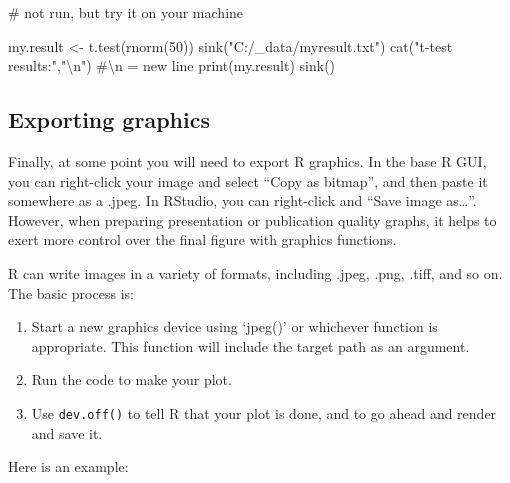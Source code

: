 \documentclass[
  13,
  letterpaper,
]{report}
\newenvironment{Shaded}{\begin{snugshade}}{\end{snugshade}}
\newcommand{\CommentTok}[1]{\textcolor[rgb]{0.37,0.37,0.37}{#1}}
\newcommand{\DecValTok}[1]{\textcolor[rgb]{0.68,0.00,0.00}{#1}}
\newcommand{\FunctionTok}[1]{\textcolor[rgb]{0.28,0.35,0.67}{#1}}
\newcommand{\NormalTok}[1]{\textcolor[rgb]{0.00,0.23,0.31}{#1}}
\newcommand{\OtherTok}[1]{\textcolor[rgb]{0.00,0.23,0.31}{#1}}
\newcommand{\SpecialCharTok}[1]{\textcolor[rgb]{0.37,0.37,0.37}{#1}}
\newcommand{\StringTok}[1]{\textcolor[rgb]{0.13,0.47,0.30}{#1}}
\begin{document}
\begin{Shaded}
\begin{Highlighting}[]
\CommentTok{\# not run, but try it on your machine}

\NormalTok{my.result }\OtherTok{\textless{}{-}} \FunctionTok{t.test}\NormalTok{(}\FunctionTok{rnorm}\NormalTok{(}\DecValTok{50}\NormalTok{))}
\FunctionTok{sink}\NormalTok{(}\StringTok{"C:/\_data/myresult.txt"}\NormalTok{)}
\FunctionTok{cat}\NormalTok{(}\StringTok{"t{-}test results:"}\NormalTok{,}\StringTok{"}\SpecialCharTok{\textbackslash{}n}\StringTok{"}\NormalTok{) }\CommentTok{\#\textbackslash{}n = new line}
\FunctionTok{print}\NormalTok{(my.result)}
\FunctionTok{sink}\NormalTok{()}
\end{Highlighting}
\end{Shaded}

\subsection{Exporting graphics}\label{sec-04-export-graphics}

Finally, at some point you will need to export R graphics. In the base R
GUI, you can right-click your image and select ``Copy as bitmap'', and
then paste it somewhere as a .jpeg. In RStudio, you can right-click and
``Save image as\ldots{}''. However, when preparing presentation or
publication quality graphs, it helps to exert more control over the
final figure with graphics functions.

R can write images in a variety of formats, including .jpeg, .png,
.tiff, and so on. The basic process is:

\begin{enumerate}
\def\labelenumi{\arabic{enumi}.}
\item
  Start a new graphics device using `jpeg()' or whichever function is
  appropriate. This function will include the target path as an
  argument.
\item
  Run the code to make your plot.
\item
  Use \texttt{dev.off()} to tell R that your plot is done, and to go
  ahead and render and save it.
\end{enumerate}

Here is an example:
\end{document}
